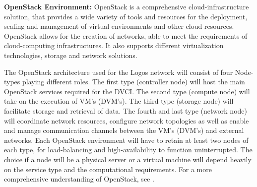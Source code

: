 \documentclass[]{article}
\begin{document}
\textbf{OpenStack Environment:}
OpenStack is a comprehensive cloud-infrastructure solution, that provides a wide variety of tools and resources for the deployment, scaling and management of virtual environments and other cloud resources. 
OpenStack allows for the creation of networks, able to meet the requirements of cloud-computing infrastructures. 
It also supports different virtualization technologies, storage and network solutions.

The OpenStack architecture used for the Logos network will consist of four Node-types playing different roles.
The first type (controller node) will host the main OpenStack services required for the DVCI.
The second type (compute node) will take on the execution of VM's (DVM's).
The third type (storage node) will facilitate storage and retrieval of data.
The fourth and last type (network node) will coordinate network resources, configure network topologies as well as enable and manage communication channels between the VM's (DVM's) and external networks. 
Each OpenStack environment will have to retain at least two nodes of each type, for load-balancing and high-availability to function uninterrupted.
The choice if a node will be a physical server or a virtual machine will depend heavily on the service type and the computational requirements.
For a more comprehensive understanding of OpenStack, see \cite{OpenStackDoc-design}.
\end{document}
